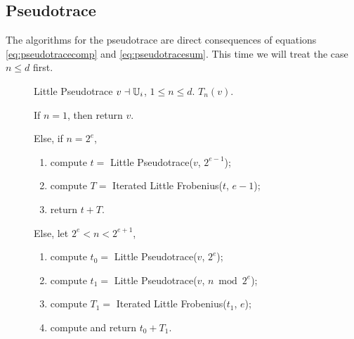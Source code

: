 \subsection{Pseudotrace}

The algorithms for the pseudotrace are direct consequences of
equations \eqref{eq:pseudotracecomp} and
\eqref{eq:pseudotracesum}. This time we will treat the case $n\le d$
first.

\begin{figure}[h]
  \begin{algorithm}
    {Little Pseudotrace}
    {$v\dashv\mathbb{U}_i$, $1\le n\le d$.}
    {$T_{n}(v)$.}
  \item \label{alg:l-pseudo:base}If $n = 1$, then return $v$.
  \item \label{alg:l-pseudo:even}Else, if $n=2^e$, 
    \begin{enumerate}
    \item \label{alg:l-pseudo:rec}compute $t = $ Little Pseudotrace($v$,
      $2^{e-1}$);
    \item \label{alg:l-pseudo:frob} compute $T = $ Iterated Little
      Frobenius($t$, $e-1$);
    \item \label{alg:l-pseudo:sum}return $t + T$.
    \end{enumerate}
  \item \label{alg:l-pseudo:odd}Else, let $2^e<n< 2^{e+1}$,
    \begin{enumerate}
    \item compute $t_0 = $ Little Pseudotrace($v$, $2^e$);
    \item compute $t_1 = $ Little Pseudotrace($v$, $n \bmod 2^e$);
    \item \label{alg:l-pseudo:frob2}compute $T_1 = $ Iterated Little
      Frobenius($t_1$, $e$);
    \item compute and return $t_0 + T_1$.
    \end{enumerate}
  \end{algorithm}
\end{figure}

